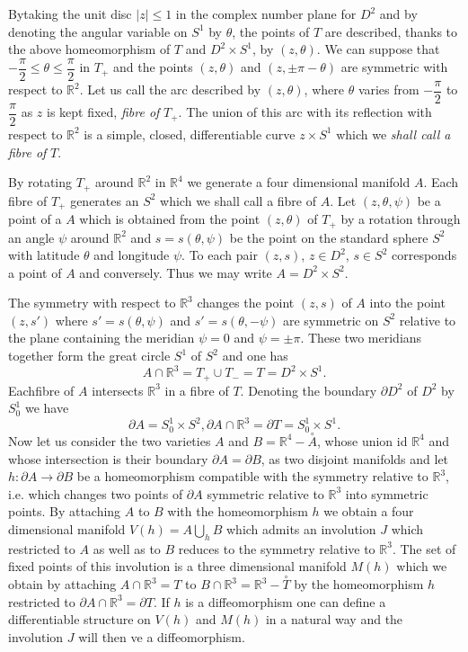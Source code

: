  By\pageoriginale taking the unit disc $|z| \leq 1$ in the complex
 number plane for 
 $D^2$ and by denoting the angular variable on $S^1$ by $\theta$, the
 points of $T$ are described, thanks to the above homeomorphism of $T$
 and $D^2 \times S^1$, by $(z, \theta)$. We can suppose that $-
 \dfrac{\pi}{2} \leq \theta \leq \dfrac{\pi}{2}$ in $T_+$ and the
 points $(z, \theta)$ and $(z, \pm \pi - \theta)$ are symmetric with
 respect to $\mathbb{R}^{2}$. Let us call the arc described by $(z,
 \theta)$, where $\theta$ varies from $- \dfrac{\pi}{2}$ to
 $\dfrac{\pi}{2}$ as $z$ is kept fixed, \textit{fibre of} $T_+$. The
 union of this arc with its reflection with respect to $\mathbb{R}^{2}$ is a
 simple, closed, differentiable curve $z \times S^1$ which we
 \textit{shall call a fibre of} $T$. 
 
 By rotating $T_+$ around $\mathbb{R}^{2}$ in $\mathbb{R}^{4}$ we
 generate a four dimensional manifold $A$. Each fibre of $T_+$
 generates an $S^2$ which we shall call a fibre of $A$. Let $(z,
 \theta, \psi)$ be a point of a $A$ which is obtained from the point
 $(z, \theta)$ of $T_+$ by a rotation through an angle $\psi$ around
 $\mathbb{R}^{2}$ and $s = s(\theta, \psi)$ be  the point on the
 standard sphere $S^2$ with latitude $\theta$ and longitude $\psi$.
 To each pair $(z,s)$, $z \in D^2$, $s \in S^2$ corresponds a point of
 $A$ and conversely. Thus  we may write $A = D^2 \times S^2$.  
 
 The symmetry with respect to $\mathbb{R}^{3}$ changes the point
 $(z,s)$ of $A$ into the point $(z,s')$ where $s' = s (\theta, \psi)$
 and $s' = s(\theta, - \psi)$ are symmetric on $S^2$ relative to the
 plane containing the meridian $\psi = 0$ and $\psi = \pm \pi$. These
 two meridians together form the great circle $S^1$ of $S^2$ and one
 has  
 $$
 A \cap \mathbb{R}^{3} = T_+ \cup T_- = T = D^2 \times S^1.
 $$
 Each\pageoriginale fibre of $A$ intersects $\mathbb{R}^{3}$ in a fibre of
 $T$. Denoting the boundary $\partial D^2$ of $D^2$ by $S^1_0$ we have 
 $$
  \partial A = S^1_0 \times S^2, \partial A \cap \mathbb{R}^{3} = 
  \partial T = S^1_0 \times S^1.  
 $$
 Now let us consider the two varieties $A$ and $B = \mathbb{R}^{4} -
 \overset{\circ}{A}$, whose union id $\mathbb{R}^{4}$ and whose 
 intersection is their boundary $\partial A = \partial B$, as two
 disjoint manifolds and let $h : \partial A\to \partial B$ be a
 homeomorphism compatible with the symmetry relative to
 $\mathbb{R}^{3}$, i.e. which changes two points of $\partial A$
 symmetric relative to $\mathbb{R}^{3}$ into symmetric points. By
 attaching $A$ to $B$ with the homeomorphism $h$ we obtain a four
 dimensional manifold $V(h) = A \bigcup\limits_{h} B$ which admits an
 involution $J$ which restricted to $A$ as well as to $B$ reduces to
 the symmetry  relative to $\mathbb{R}^{3}$. The set of fixed points
 of this involution is a three dimensional manifold $M(h)$ which we
 obtain by attaching $A \cap \mathbb{R}^{3} = T$ to $B \cap
 \mathbb{R}^{3} = \mathbb{R}^{3} - \overset{\circ}{T}$ by the
 homeomorphism $h$ restricted to $\partial A \cap \mathbb{R}^{3} =
 \partial T$. If $h$ is a diffeomorphism one can define a differentiable
 structure on $V(h)$ and $M(h)$ in a natural way and the involution
 $J$ will then ve a diffeomorphism.
 
